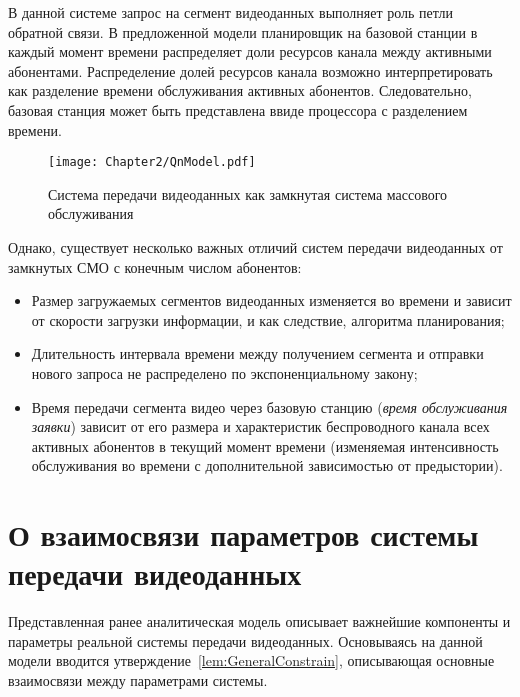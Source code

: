 В данной системе запрос на сегмент видеоданных выполняет роль петли обратной связи. В предложенной модели планировщик на базовой станции в каждый момент времени распределяет доли ресурсов канала между активными абонентами. Распределение долей ресурсов канала возможно интерпретировать как разделение времени обслуживания активных абонентов. Следовательно, базовая станция может быть представлена ввиде процессора с разделением времени.

\begin{figure}[htbp]
\begin{center}
\texttt{[image: Chapter2/QnModel.pdf]}
\caption{Система передачи видеоданных как замкнутая система массового обслуживания}
\label{fig:QnModel}
\end{center}
\end{figure}

Однако, существует несколько важных отличий систем передачи видеоданных от замкнутых СМО с конечным числом абонентов:
\begin{itemize}
	\item Размер загружаемых сегментов видеоданных изменяется во времени и зависит от скорости загрузки информации, и как следствие, алгоритма планирования;
	\item Длительность интервала времени между получением сегмента и отправки нового запроса не распределено по экспоненциальному закону;
	\item Время передачи сегмента видео через базовую станцию (\textit{время обслуживания заявки}) зависит от его размера и характеристик беспроводного канала всех активных абонентов в текущий момент времени (изменяемая интенсивность обслуживания во времени с дополнительной зависимостью от предыстории).
\end{itemize}


\section{О взаимосвязи параметров системы передачи видеоданных}
\label{chap2:InterrelationVideoParams}

Представленная ранее аналитическая модель описывает важнейшие компоненты и параметры реальной системы передачи видеоданных. Основываясь на данной модели вводится утверждение~\ref{lem:GeneralConstrain}, описывающая основные взаимосвязи между параметрами системы.

